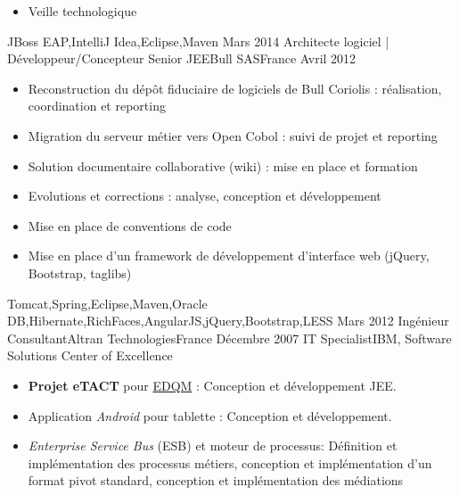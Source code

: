 \begin{experiences}
{\begin{itemize}
                        \item Veille technologique                                                                    
                      \end{itemize}
                    }
                    {JBoss EAP,IntelliJ Idea,Eclipse,Maven}
  \emptySeparator
  \experience
    {Mars 2014}     {Architecte logiciel | Développeur/Concepteur Senior JEE}{Bull SAS}{France}
    {Avril 2012}    {
                      \begin{itemize}
                        \item Reconstruction du dépôt fiduciaire de logiciels de Bull Coriolis : réalisation, coordination et reporting
                        \item Migration du serveur métier vers Open Cobol : suivi de projet et reporting                
                        \item Solution documentaire collaborative (wiki) : mise en place et formation                   
                        \item Evolutions et corrections : analyse, conception et développement                          
                        \item Mise en place de conventions de code                                                      
                        \item Mise en place d'un framework de développement d'interface web (jQuery, Bootstrap, taglibs)
                      \end{itemize}
                    }
                    {Tomcat,Spring,Eclipse,Maven,Oracle DB,Hibernate,RichFaces,AngularJS,jQuery,Bootstrap,LESS}
  \emptySeparator
  \consultantexperience
  {Mars 2012}       {Ingénieur Consultant}{Altran Technologies}{France}
  {Décembre 2007}   {IT Specialist}{IBM, Software Solutions Center of Excellence}
                    {
                      \begin{itemize}
                        \item \textbf{Projet eTACT} pour \href{https://www.edqm.eu/fr/contexte-mission-cd-p-phcmed.html}{EDQM} : Conception et développement JEE.
                        \item Application \emph{Android} pour tablette : Conception et développement.
                        \item \emph{Enterprise Service Bus} (ESB) et moteur de processus: Définition et implémentation des processus métiers, conception et implémentation d'un format pivot standard, conception et implémentation des médiations

\end{itemize}}
\end{experiences}
